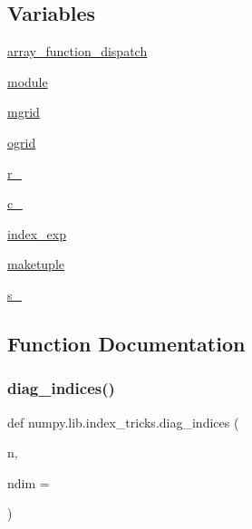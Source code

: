 \subsection*{Variables}
\begin{DoxyCompactItemize}
\item 
\hyperlink{namespacenumpy_1_1lib_1_1index__tricks_a6186cb7e25fd7c8b6fdcafefb41c7a38}{array\+\_\+function\+\_\+dispatch}
\item 
\hyperlink{namespacenumpy_1_1lib_1_1index__tricks_a6a56ad89e3d4de39c00640065928622e}{module}
\item 
\hyperlink{namespacenumpy_1_1lib_1_1index__tricks_af460db3657300678604092a36fd9fc4a}{mgrid}
\item 
\hyperlink{namespacenumpy_1_1lib_1_1index__tricks_a0efd1913fc63e3016401175f73708f99}{ogrid}
\item 
\hyperlink{namespacenumpy_1_1lib_1_1index__tricks_aab450cbe1e120d51dd756f22d17a70e9}{r\+\_\+}
\item 
\hyperlink{namespacenumpy_1_1lib_1_1index__tricks_a2da95ccc7ac993d5f84377f365163112}{c\+\_\+}
\item 
\hyperlink{namespacenumpy_1_1lib_1_1index__tricks_ac71ba02dd9cd20cb9bf13363ccd937b4}{index\+\_\+exp}
\item 
\hyperlink{namespacenumpy_1_1lib_1_1index__tricks_a34c248a18a34c1123283ad2346dcc5f0}{maketuple}
\item 
\hyperlink{namespacenumpy_1_1lib_1_1index__tricks_aa062364c520d3a2055b0e8fff56a58ad}{s\+\_\+}
\end{DoxyCompactItemize}


\subsection{Function Documentation}
\mbox{\label{namespacenumpy_1_1lib_1_1index__tricks_a60c3ddca84d2352b753fd5e01a23e414}} 
\subsubsection{\texorpdfstring{diag\+\_\+indices()}{diag\_indices()}}
{\footnotesize\ttfamily def numpy.\+lib.\+index\+\_\+tricks.\+diag\+\_\+indices (\begin{DoxyParamCaption}\item[{}]{n,  }\item[{}]{ndim = {} }\end{DoxyParamCaption})}

